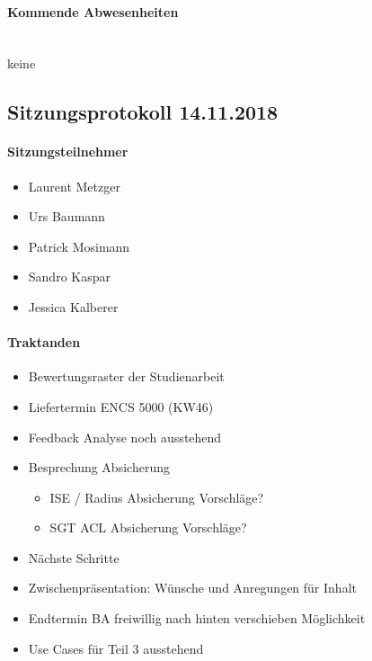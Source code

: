 \paragraph{Kommende Abwesenheiten} \mbox{}\\
keine




\newpage




\subsection{Sitzungsprotokoll 14.11.2018}

\paragraph{Sitzungsteilnehmer}
\begin{itemize}	
	\item Laurent Metzger
	\item Urs Baumann
	\item Patrick Mosimann
	\item Sandro Kaspar
	\item Jessica Kalberer
\end{itemize}

\paragraph{Traktanden}
\begin{itemize}	
	\item Bewertungsraster der Studienarbeit
	\item Liefertermin ENCS 5000 (KW46)
	\item Feedback Analyse noch ausstehend
	\item Besprechung Absicherung
	\begin{itemize}
		\item ISE / Radius Absicherung Vorschläge?
		\item SGT ACL Absicherung Vorschläge?
	\end{itemize}
	\item Nächste Schritte
	\item Zwischenpräsentation: Wünsche und Anregungen für Inhalt
	\item Endtermin BA freiwillig nach hinten verschieben Möglichkeit
	\item Use Cases für Teil 3 ausstehend
\end{itemize}

